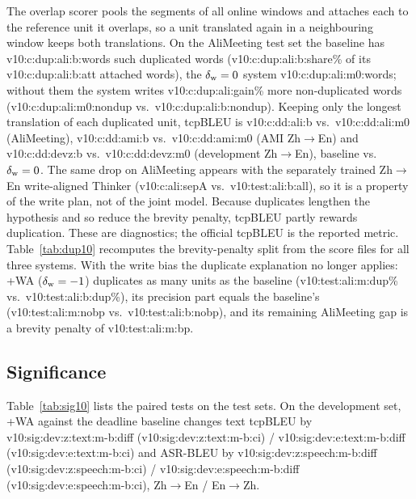 The overlap scorer pools the segments of all online windows and attaches each to the reference unit it overlaps, so a
unit translated again in a neighbouring window keeps both translations. On the AliMeeting test set the baseline has
\num{v10:c:dup:ali:b:words} such duplicated words (\num{v10:c:dup:ali:b:share}\% of its \num{v10:c:dup:ali:b:att}
attached words), the $\delta_{\mathrm{w}}=0$ system \num{v10:c:dup:ali:m0:words}; without them the system writes
\num{v10:c:dup:ali:gain}\% more non-duplicated words (\num{v10:c:dup:ali:m0:nondup} vs.\ \num{v10:c:dup:ali:b:nondup}). Keeping
only the longest translation of each duplicated unit, tcpBLEU is \num{v10:c:dd:ali:b} vs.\ \num{v10:c:dd:ali:m0}
(AliMeeting), \num{v10:c:dd:ami:b} vs.\ \num{v10:c:dd:ami:m0} (AMI Zh$\rightarrow$En) and \num{v10:c:dd:devz:b} vs.\
\num{v10:c:dd:devz:m0} (development Zh$\rightarrow$En), baseline vs.\ $\delta_{\mathrm{w}}=0$. The same drop on AliMeeting appears with
the separately trained Zh$\rightarrow$En write-aligned Thinker (\num{v10:c:ali:sepA} vs.\ \num{v10:test:ali:b:all}), so it
is a property of the write plan, not of the joint model. Because duplicates lengthen the hypothesis and so reduce the brevity
penalty, tcpBLEU partly rewards duplication. These are diagnostics; the official tcpBLEU is the reported
metric. Table~\ref{tab:dup10} recomputes the brevity-penalty split from the score files for all three systems. With
the write bias the duplicate explanation no longer applies: \sys{}+WA ($\delta_{\mathrm{w}}=-1$) duplicates as many units as the
baseline (\num{v10:test:ali:m:dup}\% vs.\ \num{v10:test:ali:b:dup}\%), its precision part equals the baseline's
(\num{v10:test:ali:m:nobp} vs.\ \num{v10:test:ali:b:nobp}), and its remaining AliMeeting gap is a brevity penalty of
\num{v10:test:ali:m:bp}.



\subsection{Significance}
\label{app:sig10}



Table~\ref{tab:sig10} lists the paired tests on the test sets. On the development set, \sys{}+WA against the deadline
baseline changes text tcpBLEU by \num{v10:sig:dev:z:text:m-b:diff} (\num{v10:sig:dev:z:text:m-b:ci}) /
\num{v10:sig:dev:e:text:m-b:diff} (\num{v10:sig:dev:e:text:m-b:ci}) and ASR-BLEU by
\num{v10:sig:dev:z:speech:m-b:diff} (\num{v10:sig:dev:z:speech:m-b:ci}) / \num{v10:sig:dev:e:speech:m-b:diff}
(\num{v10:sig:dev:e:speech:m-b:ci}), Zh$\rightarrow$En / En$\rightarrow$Zh.

